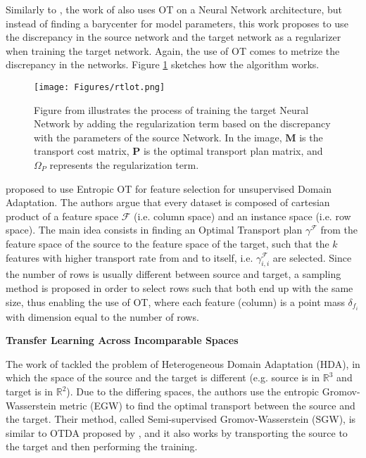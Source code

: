 Similarly to \citet{sidakfusion20}, the work of \citet{li2020representation} also uses OT on a
Neural Network architecture, but instead of finding a barycenter for model parameters, this work
proposes to use the discrepancy in the source network and the target network as a regularizer
when training the target network. Again, the use of OT comes to metrize the discrepancy in the networks.
Figure \ref{fig:rtlot} sketches how the algorithm works.

\begin{figure}[H]
	\centering
	\texttt{[image: Figures/rtlot.png]}
	\caption{Figure from \citet{li2020representation} illustrates the process of training the target Neural Network
  by adding the regularization term based on the discrepancy with the parameters of the source Network. In the image,
  $\mathbf M$ is the transport cost matrix, $\mathbf P$ is the optimal transport plan matrix, and $\Omega_P$
  represents the regularization term.}
	\label{fig:rtlot}
\end{figure}

\citet{gautheron2018feature} proposed to use Entropic OT for feature selection for unsupervised
Domain Adaptation. The authors argue that every dataset is composed of cartesian product
of a feature space $\mathcal F$ (i.e. column space) and an instance space (i.e. row space).
The main idea consists in finding an Optimal Transport plan $\gamma^\mathcal F$ from the
feature space of the source to the feature space of the target, such that the $k$ features with
higher transport rate from and to itself, i.e. $\gamma^\mathcal F_{i,i}$ are selected.
Since the number of rows is usually different between source and target, a sampling
method is proposed in order to select rows such that both end up with the same size, thus
enabling the use of OT, where each feature (column) is a point mass $\delta_{f_i}$ with dimension
equal to the number of rows.


\vspace{5mm}
\noindent \textbf{Transfer Learning Across Incomparable Spaces}
\vspace{3mm}

The work of \citet{yan2018semi} tackled the problem of Heterogeneous Domain Adaptation (HDA), in which the space
of the source and the target is different (e.g. source is in $\mathbb R^3$ and target is in $\mathbb R^2$).
Due to the differing spaces, the authors use the entropic Gromov-Wasserstein metric (EGW) to find the optimal transport
between the source and the target.
Their method, called Semi-supervised Gromov-Wasserstein (SGW), is similar to OTDA proposed by \citet{courty2014domain},
and it also works by transporting the source to the target and then performing the training.